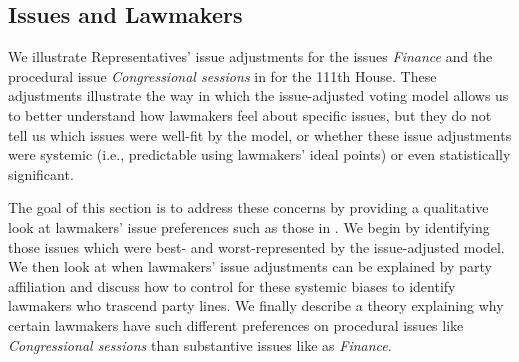 

\subsection{Issues and Lawmakers}

\label{sec:lawmakers}
\label{sec:issues}

We illustrate Representatives' issue adjustments for the issues
\emph{Finance} and the procedural issue \emph{Congressional sessions}
in  for the 111th House.  These
adjustments illustrate the way in which the issue-adjusted voting
model allows us to better understand how lawmakers feel about specific
issues, but they do not tell us which issues were well-fit by the
model, or whether these issue adjustments were systemic (i.e.,
predictable using lawmakers' ideal points) or even statistically
significant.

The goal of this section is to address these concerns by providing a
qualitative look at lawmakers' issue preferences such as those in
.  We begin by identifying those
issues which were best- and worst-represented by the issue-adjusted
model.  We then look at when lawmakers' issue adjustments can be
explained by party affiliation and discuss how to control for these
systemic biases to identify lawmakers who trascend party lines.  We
finally describe a theory explaining why certain lawmakers have such
different preferences on procedural issues like \emph{Congressional
  sessions} than substantive issues like as \emph{Finance}.

